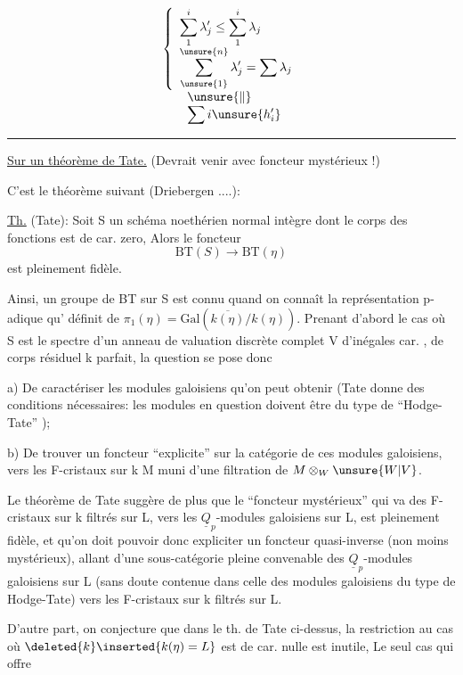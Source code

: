\[
\begin{array}{l}
\left\{\begin{array}{l}
\displaystyle\sum_1^i\lambda'_j\leq\displaystyle\sum_1^i\lambda_j\\
\displaystyle\sum_{\unsure{1}}^{\unsure{n}}\lambda'_j=\displaystyle\sum\lambda_j
\end{array}\right.\\
\qquad\unsure{\Vert}\\
\qquad\displaystyle\sum i\unsure{h'_i}
\end{array}
\]
\hrule

\uline{Sur un théorème de Tate.} (Devrait venir avec foncteur mystérieux !)

C'est le théorème suivant (Driebergen ....):

\uline{Th.} (Tate): Soit S un schéma noethérien normal intègre dont le corps des fonctions  est de car. zero, Alors le foncteur
\[
\mathrm{BT}(S)\longrightarrow\mathrm{BT}(\eta)
\]
est pleinement fidèle.

Ainsi, un groupe de BT sur S est connu  quand on connaît la représentation p-adique qu' définit de $\pi_1(\eta)=\mathrm{Gal}(\overline{k(\eta)}/k(\eta))$. Prenant d'abord le cas où S est le spectre d'un anneau de valuation discrète complet V d'inégales car. , de corps  résiduel k parfait, la question se pose donc

a) De caractériser les modules galoisiens qu'on peut obtenir (Tate donne des conditions nécessaires: les modules en question doivent être du type de ``Hodge-Tate'' );

b) De trouver un foncteur ``explicite'' sur la catégorie de ces modules galoisiens, vers les F-cristaux sur k M muni d'une filtration de $M\otimes_W\unsure{W|V}$.

Le théorème de Tate suggère de plus que le ``foncteur mystérieux'' qui va des F-cristaux sur k filtrés sur L, vers les $\underline{Q}_p$-modules galoisiens sur L, est pleinement fidèle, et qu'on doit pouvoir donc  expliciter un foncteur quasi-inverse (non moins mystérieux), allant d'une sous-catégorie pleine convenable des $\underline{Q}_p$-modules galoisiens sur L (sans doute contenue dans celle des modules galoisiens du type de Hodge-Tate) vers les F-cristaux sur k filtrés sur L.

D'autre part, on conjecture que dans le th. de Tate ci-dessus, la restriction au cas où $\deleted{k}\inserted{k(\eta)=L}$ est de car. nulle est inutile, Le seul cas qui offre

